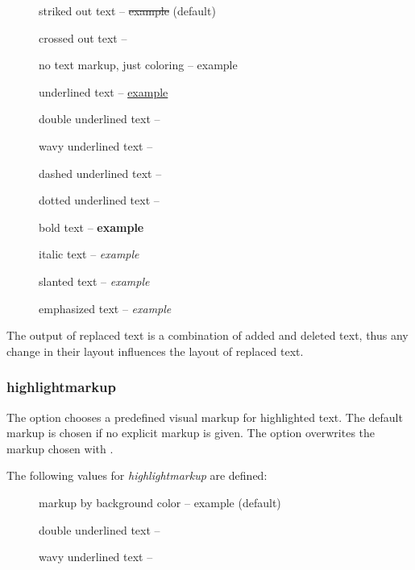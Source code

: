 \begin{description}
	\item [] striked out text -- \sout{example} (default)
	\item [] crossed out text -- 
	\item [] no text markup, just coloring -- {\color{orange} example}
	\item [] underlined text -- \uline{example}
	\item [] double underlined text -- 
	\item [] wavy underlined text -- 
	\item [] dashed underlined text -- 
	\item [] dotted underlined text -- 
	\item [] bold text -- \textbf{example}
	\item [] italic text -- \textit{example}
	\item [] slanted text -- \textsl{example}
	\item [] emphasized text -- \emph{example}
\end{description}

The output of replaced text is a combination of added and deleted text, thus any change in their layout influences the layout of replaced text.



\subsubsection{highlightmarkup}


The  option chooses a predefined visual markup for highlighted text.
The default markup is chosen if no explicit markup is given.
The option  overwrites the markup chosen with .

The following values for \emph{highlightmarkup} are defined:

\begin{description}
	\item [] markup by background color -- \colorbox{orange!30}{example} (default)
	\item [] double underlined text -- 
	\item [] wavy underlined text -- 
\end{description}

